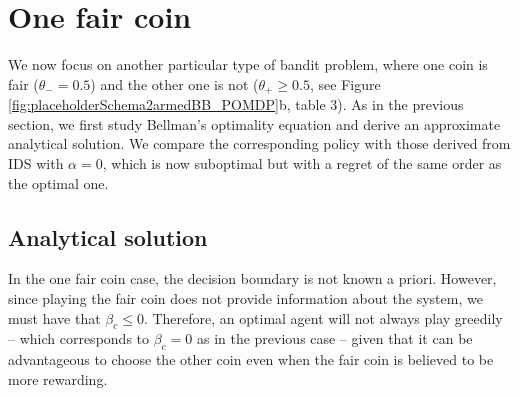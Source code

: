 \documentclass[aps,nofootinbib,groupaddress,superscriptaddress,reprint,amsmath,amssymb,graphicx,onecolumn,prx]{revtex4-2}
\begin{document}
\section{One fair coin}
\noindent We now focus on another particular type of bandit problem, where one coin is fair ($\theta_- = 0.5$) and the other one is not ($\theta_+ \ge 0.5$, see Figure \ref{fig:placeholderSchema2armedBB_POMDP}b, table 3). As in the previous section, we first study Bellman's optimality equation and derive an approximate analytical solution. We compare the corresponding policy with those derived from IDS with $\alpha = 0$, which is now suboptimal but with a regret of the same order as the optimal one.


\subsection{Analytical solution}
\noindent In the one fair coin case, the decision boundary is not known a priori. However, since playing the fair coin does not provide information about the system, we must have that $\beta_c \le 0$. Therefore, an optimal agent will not always play greedily -- which corresponds to $\beta_c = 0$ as in the previous case -- given that 
it can be advantageous to choose the other coin even when the fair coin is believed to be more rewarding.
\end{document}
